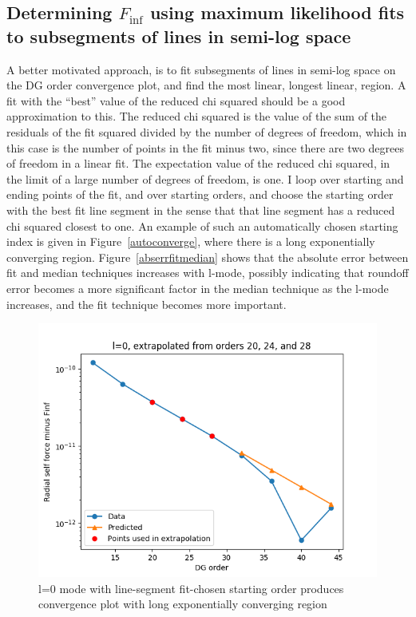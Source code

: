 \subsection{Determining $F_{\inf}$ using maximum likelihood fits to subsegments of lines in semi-log space}
A better motivated approach, is to fit subsegments of lines in semi-log space on the DG order convergence plot, and find the most linear, longest linear, region. A fit with the ``best'' value of the reduced chi squared should be a good approximation to this. The reduced chi squared is the value of the sum of the residuals of the fit squared divided by the number of degrees of freedom, which in this case is the number of points in the fit minus two, since there are two degrees of freedom in a linear fit. The expectation value of the reduced chi squared, in the limit of a large number of degrees of freedom, is one. I loop over starting and ending points of the fit, and over starting orders, and choose the starting order with the best fit line segment in the sense that that line segment has a reduced chi squared closest to one. An example of such an automatically chosen starting index is given in Figure~\ref{autoconverge}, where there is a long exponentially converging region. Figure~\ref{abserrfitmedian} shows that the absolute error between fit and median techniques increases with l-mode, possibly indicating that roundoff error becomes a more significant factor in the median technique as the l-mode increases, and the fit technique becomes more important.

\begin{figure}
  \includegraphics{fittingtechniqet370l0}
  \caption{l=0 mode with line-segment fit-chosen starting order produces convergence plot with long exponentially converging region}
\end{figure}


